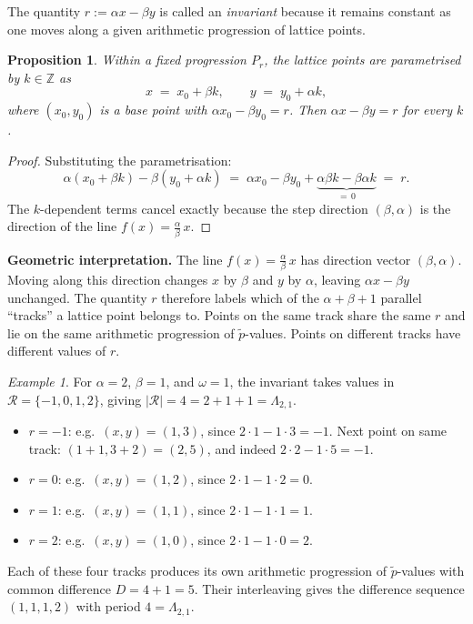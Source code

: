 \documentclass[11pt]{article}
\theoremstyle{definition}
\theoremstyle{plain}
\newtheorem{proposition}{Proposition}
\theoremstyle{remark}
\newtheorem{example}{Example}
\begin{document}
The quantity $r := \alpha x - \beta y$ is called an \emph{invariant} because
it remains constant as one moves along a given arithmetic progression of
lattice points.

\begin{proposition}
Within a fixed progression $P_r$, the lattice points are parametrised by
$k \in \mathbb{Z}$ as
\[
    x \;=\; x_0 + \beta k, \qquad y \;=\; y_0 + \alpha k,
\]
where $(x_0, y_0)$ is a base point with $\alpha x_0 - \beta y_0 = r$.
Then $\alpha x - \beta y = r$ for every $k$.
\end{proposition}

\begin{proof}
Substituting the parametrisation:
\[
    \alpha(x_0 + \beta k) - \beta(y_0 + \alpha k)
    \;=\; \alpha x_0 - \beta y_0
        + \underbrace{\alpha \beta k - \beta \alpha k}_{=\, 0}
    \;=\; r.
\]
The $k$-dependent terms cancel exactly because the step direction
$(\beta, \alpha)$ is the direction of the line
$f(x) = \frac{\alpha}{\beta}\,x$.
\end{proof}

\noindent\textbf{Geometric interpretation.}
The line $f(x) = \frac{\alpha}{\beta}\,x$ has direction vector
$(\beta, \alpha)$.  Moving along this direction changes $x$ by $\beta$ and
$y$ by $\alpha$, leaving $\alpha x - \beta y$ unchanged.  The quantity $r$
therefore labels which of the $\alpha + \beta + 1$ parallel ``tracks''
a lattice point belongs to.  Points on the same track share the same $r$
and lie on the same arithmetic progression of $\tilde{p}$-values.
Points on different tracks have different values of $r$.

\begin{example}
For $\alpha = 2$, $\beta = 1$, and $\omega = 1$, the invariant takes values
in $\mathcal{R} = \{-1, 0, 1, 2\}$, giving $|\mathcal{R}| = 4 = 2 + 1 + 1
= \Lambda_{2,1}$.
\begin{itemize}
    \item $r = -1$: e.g.\ $(x, y) = (1, 3)$, since $2 \cdot 1 - 1 \cdot 3 = -1$.
          Next point on same track: $(1 + 1, 3 + 2) = (2, 5)$, and indeed
          $2 \cdot 2 - 1 \cdot 5 = -1$.
    \item $r = 0$: e.g.\ $(x, y) = (1, 2)$, since $2 \cdot 1 - 1 \cdot 2 = 0$.
    \item $r = 1$: e.g.\ $(x, y) = (1, 1)$, since $2 \cdot 1 - 1 \cdot 1 = 1$.
    \item $r = 2$: e.g.\ $(x, y) = (1, 0)$, since $2 \cdot 1 - 1 \cdot 0 = 2$.
\end{itemize}
Each of these four tracks produces its own arithmetic progression of
$\tilde{p}$-values with common difference $D = 4 + 1 = 5$.
Their interleaving gives the difference sequence $(1, 1, 1, 2)$ with period
$4 = \Lambda_{2,1}$.
\end{example}
\end{document}
